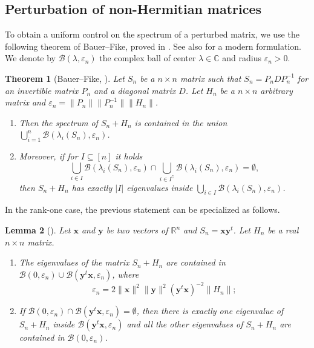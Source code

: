 \documentclass[11pt,oneside]{amsart}
\theoremstyle{plain}
\newtheorem{theorem}{Theorem}[section]
\newtheorem{lemma}[theorem]{Lemma}
\numberwithin{equation}{section}
\newcommand{\R}{\mathbb{R}}
\newcommand{\eps}{\varepsilon}
\newcommand{\deterministic}{S_n}
\newcommand{\xx}{\boldsymbol{x}}
\newcommand{\yy}{\boldsymbol{y}}
\begin{document}
\subsection{Perturbation of non-Hermitian matrices}

\label{subsec:sp-perturb}

To obtain a uniform control on the spectrum of a perturbed matrix, we use the following theorem of Bauer--Fike, proved in \cite{BF}. See also \cite[Th.\ 4]{Coste} for a modern formulation. We denote by $\mathcal{B}(\lambda,\eps_n)$ the complex ball of center $\lambda \in \mathbb{C}$ and radius $\eps_n>0$.

\begin{theorem}[Bauer--Fike, \cite{BF}] \label{thm:Bauer-Fike}
    Let $\deterministic$ be a $n \times n$ matrix such that $\deterministic=P_nDP_n^{-1}$ for an invertible matrix $P_n$ and a diagonal matrix $D$. Let $H_n$ be a $n \times n$ arbitrary matrix and $\eps_n = \|P_n\|\|P_n^{-1}\|\|H_n\|$. 
    \begin{enumerate}
        \item[(i)] Then the spectrum of $\deterministic+H_n$ is contained in the union $\bigcup_{i= 1}^n \mathcal{B}(\lambda_i(\deterministic),\eps_n)$.
        \item[(ii)] Moreover, if for $I \subseteq [n]$ it holds
        $$\bigcup_{i \in I} \mathcal{B}(\lambda_i(\deterministic),\eps_n) \cap \bigcup_{i \in I^\complement} \mathcal{B}(\lambda_i(\deterministic),\eps_n)=\emptyset,$$
        then $\deterministic+H_n$ has exactly $|I|$ eigenvalues inside $\bigcup_{i \in I} \mathcal{B}(\lambda_i(\deterministic),\eps_n)$.
    \end{enumerate}
\end{theorem}
In the rank-one case, the previous statement can be specialized as follows.
    \begin{lemma}[{\cite[Lemma A.1]{Coste}}] \label{lem:spectrum}
Let $\xx$ and $\yy$ be two vectors of $\R^n$ and $\deterministic =\xx\yy^t$. Let $H_n$ be a real $n \times n$ matrix.
\begin{enumerate}
\item[(i)] The eigenvalues of the matrix $\deterministic + H_n$ are contained in  
$\mathcal{B}(0, \eps_n) \cup \mathcal{B}(\yy^t\xx, \eps_n)$, where
$$\eps_n = 2\|\xx\|^2\|\yy\|^2(\yy^t\xx)^{-2}\|H_n \|;$$
\item[(ii)] If 
$\mathcal{B}(0, \eps_n) \cap \mathcal{B}(\yy^t\xx, \eps_n) = \emptyset$, then there is exactly one eigenvalue of $\deterministic + H_n$ inside 
$\mathcal{B}(\yy^t\xx, \eps_n)$ and all the other eigenvalues of $\deterministic + H_n$ are contained in $\mathcal{B}(0, \eps_n)$.
\end{enumerate}
\end{lemma}
 
\end{document}

